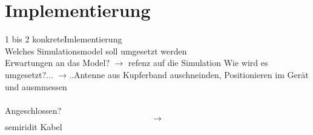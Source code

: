 \newpage 
\thispagestyle{empty}
\section{Implementierung}\label{sec:Implementierung}
1 bis 2 konkreteImlementierung\\
Welches Simulationsmodel soll umgesetzt werden\\
Erwartungen an das Model? $\rightarrow$ refenz auf die Simulation
Wie wird es umgesetzt?...  $\rightarrow$..Antenne aus Kupferband auschneinden, Positionieren im Gerät und ausmmessen\\
\\
Angeschlossen?$$\rightarrow$$ semiridit Kabel \\



